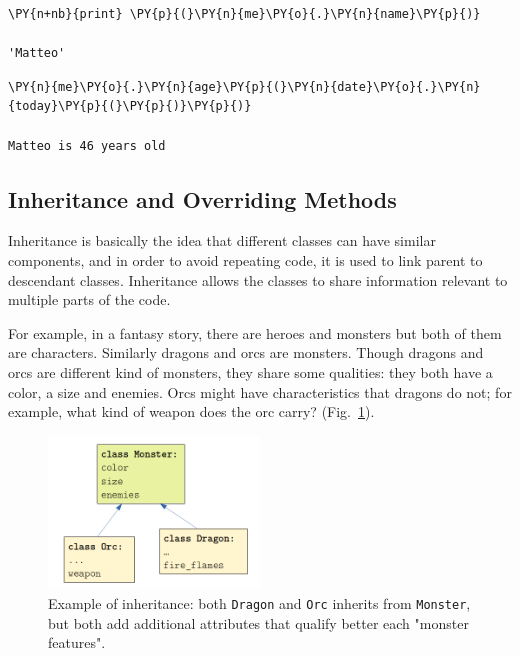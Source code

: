 \begin{codebox}
\begin{Verbatim}[commandchars=\\\{\}]
\PY{n+nb}{print} \PY{p}{(}\PY{n}{me}\PY{o}{.}\PY{n}{name}\PY{p}{)}

'Matteo'
\end{Verbatim}
\end{codebox}
        
\begin{codebox}
\begin{Verbatim}[commandchars=\\\{\}]
\PY{n}{me}\PY{o}{.}\PY{n}{age}\PY{p}{(}\PY{n}{date}\PY{o}{.}\PY{n}{today}\PY{p}{(}\PY{p}{)}\PY{p}{)}

Matteo is 46 years old
\end{Verbatim}
\end{codebox}

\subsection{Inheritance and Overriding Methods}\label{inheritance-and-overriding-methods}

Inheritance is basically the idea that different classes can have
similar components, and in order to avoid repeating code, it is
used to link parent to descendant classes. Inheritance allows the classes to 
share information relevant to multiple parts of the code.

For example, in a fantasy story, there are heroes and monsters but both of them are characters. 
Similarly dragons and orcs are monsters. Though dragons and orcs are different kind of monsters, 
they share some qualities: they both have a color, a size and enemies. Orcs
might have characteristics that dragons do not; for example, what kind
of weapon does the orc carry? (Fig.~\ref{fig:inheritance}). 

\begin{figure}[h]
  \centering
  \includegraphics[width=0.5\textwidth]{figures/inheritance.png}
  \caption{Example of inheritance: both \texttt{Dragon} and \texttt{Orc} inherits from \texttt{Monster}, but both add additional attributes that qualify better each "monster features".}
  \label{fig:inheritance}
\end{figure}

